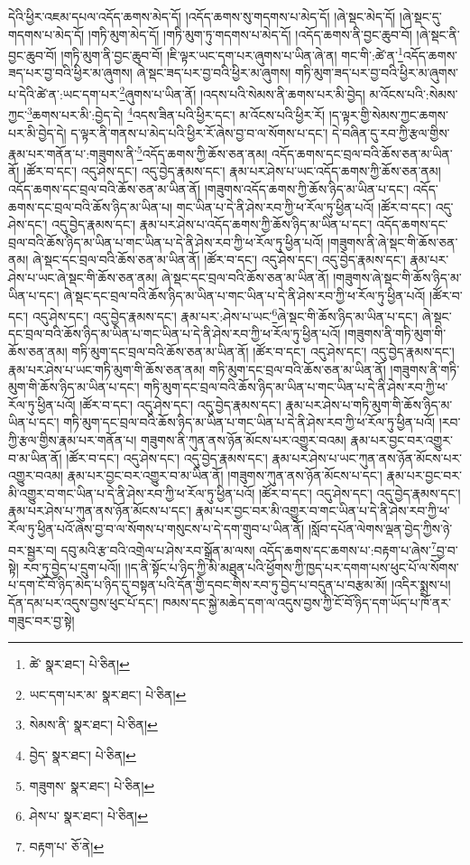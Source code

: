 དེའི་ཕྱིར་འཇམ་དཔལ་འདོད་ཆགས་མེད་དོ། །འདོད་ཆགས་སུ་གདགས་པ་མེད་དོ། །ཞེ་སྡང་མེད་དོ། །ཞེ་སྡང་དུ་གདགས་པ་མེད་དོ། །གཏི་མུག་མེད་དོ། །གཏི་མུག་ཏུ་གདགས་པ་མེད་དོ། །འདོད་ཆགས་ནི་བྱང་ཆུབ་བོ། །ཞེ་སྡང་ནི་བྱང་ཆུབ་བོ། །གཏི་མུག་ནི་བྱང་ཆུབ་བོ། །ཇི་ལྟར་ཡང་དག་པར་ཞུགས་པ་ཡིན་ཞེ་ན། གང་གི་:ཚེ་ན་\footnote{ཚེ་  སྣར་ཐང་།  པེ་ཅིན། }འདོད་ཆགས་ཟད་པར་བྱ་བའི་ཕྱིར་མ་ཞུགས། ཞེ་སྡང་ཟད་པར་བྱ་བའི་ཕྱིར་མ་ཞུགས། གཏི་མུག་ཟད་པར་བྱ་བའི་ཕྱིར་མ་ཞུགས་པ་དེའི་ཚེ་ན་:ཡང་དག་པར་\footnote{ཡང་དག་པར་མ་  སྣར་ཐང་།  པེ་ཅིན། }ཞུགས་པ་ཡིན་ནོ། །འདས་པའི་སེམས་ནི་ཆགས་པར་མི་བྱེད། མ་འོངས་པའི་:སེམས་ཀྱང་\footnote{སེམས་ནི་  སྣར་ཐང་།  པེ་ཅིན། }ཆགས་པར་མི་:བྱེད་དེ། \footnote{བྱེད་  སྣར་ཐང་།  པེ་ཅིན། }འདས་ཟིན་པའི་ཕྱིར་དང་། མ་འོངས་པའི་ཕྱིར་རོ། །ད་ལྟར་གྱི་སེམས་ཀྱང་ཆགས་པར་མི་བྱེད་དེ། ད་ལྟར་ནི་གནས་པ་མེད་པའི་ཕྱིར་རོ་ཞེས་བྱ་བ་ལ་སོགས་པ་དང་། དེ་བཞིན་དུ་རབ་ཀྱི་རྩལ་གྱིས་རྣམ་པར་གནོན་པ་:གཟུགས་ནི་\footnote{གཟུགས་  སྣར་ཐང་།  པེ་ཅིན། }འདོད་ཆགས་ཀྱི་ཆོས་ཅན་ནམ། འདོད་ཆགས་དང་བྲལ་བའི་ཆོས་ཅན་མ་ཡིན་ནོ། །ཚོར་བ་དང་། འདུ་ཤེས་དང་། འདུ་བྱེད་རྣམས་དང་། རྣམ་པར་ཤེས་པ་ཡང་འདོད་ཆགས་ཀྱི་ཆོས་ཅན་ནམ། འདོད་ཆགས་དང་བྲལ་བའི་ཆོས་ཅན་མ་ཡིན་ནོ། །གཟུགས་འདོད་ཆགས་ཀྱི་ཆོས་ཉིད་མ་ཡིན་པ་དང་། འདོད་ཆགས་དང་བྲལ་བའི་ཆོས་ཉིད་མ་ཡིན་པ། གང་ཡིན་པ་དེ་ནི་ཤེས་རབ་ཀྱི་ཕ་རོལ་ཏུ་ཕྱིན་པའོ། །ཚོར་བ་དང་། འདུ་ཤེས་དང་། འདུ་བྱེད་རྣམས་དང་། རྣམ་པར་ཤེས་པ་འདོད་ཆགས་ཀྱི་ཆོས་ཉིད་མ་ཡིན་པ་དང་། འདོད་ཆགས་དང་བྲལ་བའི་ཆོས་ཉིད་མ་ཡིན་པ་གང་ཡིན་པ་དེ་ནི་ཤེས་རབ་ཀྱི་ཕ་རོལ་ཏུ་ཕྱིན་པའོ། །གཟུགས་ནི་ཞེ་སྡང་གི་ཆོས་ཅན་ནམ། ཞེ་སྡང་དང་བྲལ་བའི་ཆོས་ཅན་མ་ཡིན་ནོ། །ཚོར་བ་དང་། འདུ་ཤེས་དང་། འདུ་བྱེད་རྣམས་དང་། རྣམ་པར་ཤེས་པ་ཡང་ཞེ་སྡང་གི་ཆོས་ཅན་ནམ། ཞེ་སྡང་དང་བྲལ་བའི་ཆོས་ཅན་མ་ཡིན་ནོ། །གཟུགས་ཞེ་སྡང་གི་ཆོས་ཉིད་མ་ཡིན་པ་དང་། ཞེ་སྡང་དང་བྲལ་བའི་ཆོས་ཉིད་མ་ཡིན་པ་གང་ཡིན་པ་དེ་ནི་ཤེས་རབ་ཀྱི་ཕ་རོལ་ཏུ་ཕྱིན་པའོ། །ཚོར་བ་དང་། འདུ་ཤེས་དང་། འདུ་བྱེད་རྣམས་དང་། རྣམ་པར་:ཤེས་པ་ཡང་\footnote{ཤེས་པ་  སྣར་ཐང་།  པེ་ཅིན། }ཞེ་སྡང་གི་ཆོས་ཉིད་མ་ཡིན་པ་དང་། ཞེ་སྡང་དང་བྲལ་བའི་ཆོས་ཉིད་མ་ཡིན་པ་གང་ཡིན་པ་དེ་ནི་ཤེས་རབ་ཀྱི་ཕ་རོལ་ཏུ་ཕྱིན་པའོ། །གཟུགས་ནི་གཏི་མུག་གི་ཆོས་ཅན་ནམ། གཏི་མུག་དང་བྲལ་བའི་ཆོས་ཅན་མ་ཡིན་ནོ། །ཚོར་བ་དང་། འདུ་ཤེས་དང་། འདུ་བྱེད་རྣམས་དང་། རྣམ་པར་ཤེས་པ་ཡང་གཏི་མུག་གི་ཆོས་ཅན་ནམ། གཏི་མུག་དང་བྲལ་བའི་ཆོས་ཅན་མ་ཡིན་ནོ། །གཟུགས་ནི་གཏི་མུག་གི་ཆོས་ཉིད་མ་ཡིན་པ་དང་། གཏི་མུག་དང་བྲལ་བའི་ཆོས་ཉིད་མ་ཡིན་པ་གང་ཡིན་པ་དེ་ནི་ཤེས་རབ་ཀྱི་ཕ་རོལ་ཏུ་ཕྱིན་པའོ། །ཚོར་བ་དང་། འདུ་ཤེས་དང་། འདུ་བྱེད་རྣམས་དང་། རྣམ་པར་ཤེས་པ་གཏི་མུག་གི་ཆོས་ཉིད་མ་ཡིན་པ་དང་། གཏི་མུག་དང་བྲལ་བའི་ཆོས་ཉིད་མ་ཡིན་པ་གང་ཡིན་པ་དེ་ནི་ཤེས་རབ་ཀྱི་ཕ་རོལ་ཏུ་ཕྱིན་པའོ། །རབ་ཀྱི་རྩལ་གྱིས་རྣམ་པར་གནོན་པ། གཟུགས་ནི་ཀུན་ནས་ཉོན་མོངས་པར་འགྱུར་བའམ། རྣམ་པར་བྱང་བར་འགྱུར་བ་མ་ཡིན་ནོ། །ཚོར་བ་དང་། འདུ་ཤེས་དང་། འདུ་བྱེད་རྣམས་དང་། རྣམ་པར་ཤེས་པ་ཡང་ཀུན་ནས་ཉོན་མོངས་པར་འགྱུར་བའམ། རྣམ་པར་བྱང་བར་འགྱུར་བ་མ་ཡིན་ནོ། །གཟུགས་ཀུན་ནས་ཉོན་མོངས་པ་དང་། རྣམ་པར་བྱང་བར་མི་འགྱུར་བ་གང་ཡིན་པ་དེ་ནི་ཤེས་རབ་ཀྱི་ཕ་རོལ་ཏུ་ཕྱིན་པའོ། །ཚོར་བ་དང་། འདུ་ཤེས་དང་། འདུ་བྱེད་རྣམས་དང་། རྣམ་པར་ཤེས་པ་ཀུན་ནས་ཉོན་མོངས་པ་དང་། རྣམ་པར་བྱང་བར་མི་འགྱུར་བ་གང་ཡིན་པ་དེ་ནི་ཤེས་རབ་ཀྱི་ཕ་རོལ་ཏུ་ཕྱིན་པའོ་ཞེས་བྱ་བ་ལ་སོགས་པ་གསུངས་པ་དེ་དག་གྲུབ་པ་ཡིན་ནོ། །སློབ་དཔོན་ལེགས་ལྡན་བྱེད་ཀྱིས་ཉེ་བར་སྦྱར་བ། དབུ་མའི་རྩ་བའི་འགྲེལ་པ་ཤེས་རབ་སྒྲོན་མ་ལས། འདོད་ཆགས་དང་ཆགས་པ་:བརྟག་པ་ཞེས་\footnote{བརྟག་པ་  ཅོ་ནེ། }བྱ་བ་སྟེ། རབ་ཏུ་བྱེད་པ་དྲུག་པའོ།། །།ད་ནི་སྟོང་པ་ཉིད་ཀྱི་མི་མཐུན་པའི་ཕྱོགས་ཀྱི་ཁྱད་པར་དགག་པས་ཕུང་པོ་ལ་སོགས་པ་དག་ངོ་བོ་ཉིད་མེད་པ་ཉིད་དུ་བསྟན་པའི་དོན་གྱི་དབང་གིས་རབ་ཏུ་བྱེད་པ་བདུན་པ་བརྩམ་མོ། །འདིར་སྨྲས་པ། དོན་དམ་པར་འདུས་བྱས་ཕུང་པོ་དང་། ཁམས་དང་སྐྱེ་མཆེད་དག་ལ་འདུས་བྱས་ཀྱི་ངོ་བོ་ཉིད་དག་ཡོད་པ་ཁོ་ནར་གཟུང་བར་བྱ་སྟེ། 